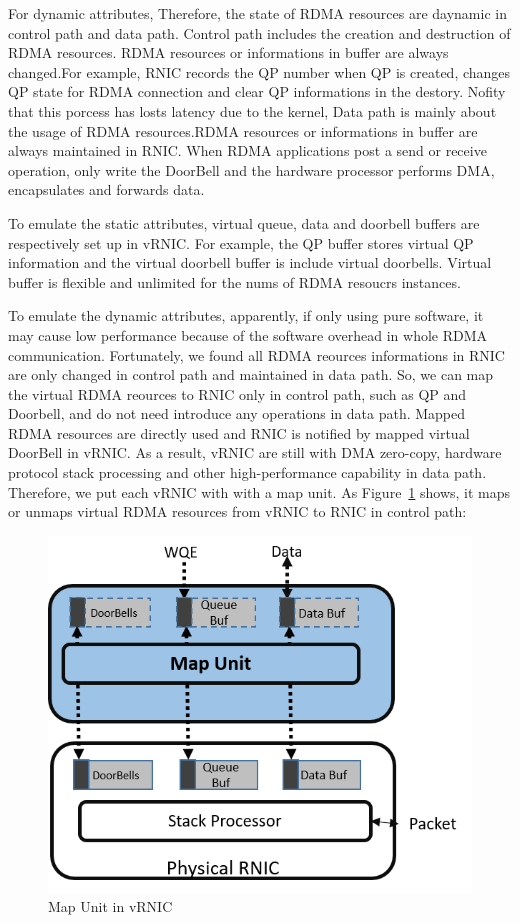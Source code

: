 For dynamic attributes, Therefore, the state of RDMA resources are daynamic in control path and data path. Control path includes the creation and destruction of RDMA resources. RDMA resources or informations in buffer are always changed.For example, RNIC records the QP number when QP is created, changes QP state for RDMA connection and clear QP informations in the destory. Nofity that this porcess has losts latency due to the kernel, Data path is mainly about the usage of RDMA resources.RDMA resources or informations in buffer are always maintained in RNIC. When RDMA applications post a send or receive operation, only write the DoorBell and the hardware processor performs DMA, encapsulates and forwards data.

To emulate the static attributes, virtual queue, data and doorbell buffers are respectively set up in vRNIC. For example, the QP buffer stores virtual QP information and the virtual doorbell buffer is include virtual doorbells. Virtual buffer is flexible and unlimited for the nums of RDMA resoucrs instances. 

To emulate the dynamic attributes, apparently, if only using pure software, it may cause low performance because of the software overhead in whole RDMA communication. Fortunately, we found all RDMA reources informations in RNIC are only changed in control path and maintained in data path. So, we can map the virtual RDMA reources to RNIC only in control path, such as QP and Doorbell,  and do not need introduce any operations in data path. Mapped RDMA resources are directly used and RNIC is notified by mapped virtual DoorBell in vRNIC. As a result, vRNIC are still with DMA zero-copy, hardware protocol stack processing and other high-performance capability in data path. Therefore, we put each vRNIC with with a map unit. As Figure~\ref{fig:map-unit} shows, it maps or unmaps virtual RDMA resources from vRNIC to RNIC in control path:

\begin{figure}[!ht]
	\centering
	\includegraphics[width=1.0\linewidth]{images/map-unit}
	\caption{Map Unit in vRNIC}
	\label{fig:map-unit}
\end{figure}

